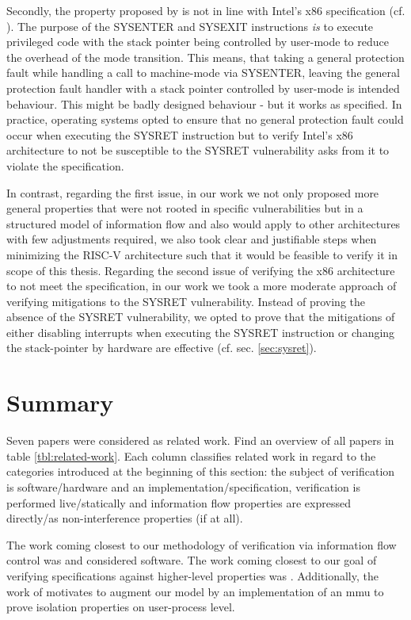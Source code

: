 Secondly, the property proposed by \citeauthor{BradfieldS16} is not in line with Intel's x86 specification (cf. \cite{Dunlap19}).
The purpose of the SYSENTER and SYSEXIT instructions \textit{is} to execute privileged code with the stack pointer being controlled by user-mode to reduce the overhead of the mode transition.
This means, that taking a general protection fault while handling a call to machine-mode via SYSENTER, leaving the general protection fault handler with a stack pointer controlled by user-mode is intended behaviour.
This might be badly designed behaviour - but it works as specified.
In practice, operating systems opted to ensure that no general protection fault could occur when executing the SYSRET instruction but to verify Intel's x86 architecture to not be susceptible to the SYSRET vulnerability asks from it to violate the specification.

In contrast, regarding the first issue, in our work we not only proposed more general properties that were not rooted in specific vulnerabilities but in a structured model of information flow and also would apply to other architectures with few adjustments required, we also took clear and justifiable steps when minimizing the RISC-V architecture such that it would be feasible to verify it in scope of this thesis.
Regarding the second issue of verifying the x86 architecture to not meet the specification, in our work we took a more moderate approach of verifying mitigations to the SYSRET vulnerability.
Instead of proving the absence of the SYSRET vulnerability, we opted to prove that the mitigations of either disabling interrupts when executing the SYSRET instruction or changing the stack-pointer by hardware are effective (cf. sec. \ref{sec:sysret}).

\section{Summary}

Seven papers were considered as related work.
Find an overview of all papers in table \ref{tbl:related-work}.
Each column classifies related work in regard to the categories introduced at the beginning of this section: the subject of verification is software/hardware and an implementation/specification, verification is performed live/statically and information flow properties are expressed directly/as non-interference properties (if at all).

The work coming closest to our methodology of verification via information flow control was \cite{GordonKPGNR15,SuhLZD04} and considered software.
The work coming closest to our goal of verifying specifications against higher-level properties was \cite{Fox02,KhakpourSD13,BradfieldS16}.
Additionally, the work of \cite{SuhLZD04,KhakpourSD13} motivates to augment our model by an implementation of an \gls{mmu} to prove isolation properties on user-process level.

